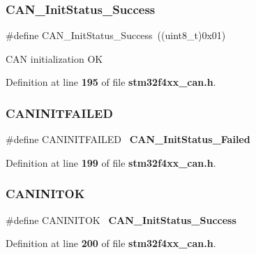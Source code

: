 \subsubsection{C\+A\+N\+\_\+\+Init\+Status\+\_\+\+Success}
{\footnotesize\ttfamily \#define C\+A\+N\+\_\+\+Init\+Status\+\_\+\+Success~((uint8\+\_\+t)0x01)}

C\+AN initialization OK 

Definition at line \textbf{ 195} of file \textbf{ stm32f4xx\+\_\+can.\+h}.

\mbox{\label{group__CAN__InitStatus_ga0539a9e5a898fcd71c4dcb7e341e4b86}} 
\subsubsection{C\+A\+N\+I\+N\+I\+T\+F\+A\+I\+L\+ED}
{\footnotesize\ttfamily \#define C\+A\+N\+I\+N\+I\+T\+F\+A\+I\+L\+ED~\textbf{ C\+A\+N\+\_\+\+Init\+Status\+\_\+\+Failed}}



Definition at line \textbf{ 199} of file \textbf{ stm32f4xx\+\_\+can.\+h}.

\mbox{\label{group__CAN__InitStatus_ga14cba0b5b506be73e2f45c732f8e54cb}} 
\subsubsection{C\+A\+N\+I\+N\+I\+T\+OK}
{\footnotesize\ttfamily \#define C\+A\+N\+I\+N\+I\+T\+OK~\textbf{ C\+A\+N\+\_\+\+Init\+Status\+\_\+\+Success}}



Definition at line \textbf{ 200} of file \textbf{ stm32f4xx\+\_\+can.\+h}.

